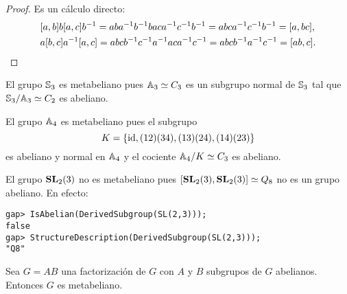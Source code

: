\begin{proof}
Es un cálculo directo:
 	\begin{align*}
 	&[a,b]b[a,c]b^{-1}=aba^{-1}b^{-1}baca^{-1}c^{-1}b^{-1}=abca^{-1}c^{-1}b^{-1}=[a,bc],\\
 	&a[b,c]a^{-1}[a,c]=abcb^{-1}c^{-1}a^{-1}aca^{-1}c^{-1}=abcb^{-1}a^{-1}c^{-1}=[ab,c].\qedhere
 	\end{align*}
\end{proof}

\begin{example}
	El grupo $\mathbb{S}_3$ es metabeliano pues $\mathbb{A}_3\simeq C_3$ es un subgrupo normal de
	$\mathbb{S}_3$ tal que $\mathbb{S}_3/\mathbb{A}_3\simeq C_2$ es abeliano.
\end{example}

\begin{example}
	El grupo $\mathbb{A}_4$ es metabeliano pues el subgrupo 
	\[
	K=\{\operatorname{id},(12)(34),(13)(24),(14)(23)\}
	\]
	es abeliano y
	normal en $\mathbb{A}_4$ y el cociente $\mathbb{A}_4/K\simeq C_3$ es abeliano.
\end{example}


\begin{example}
	El grupo $\mathbf{SL}_2(3)$ no es metabeliano pues $[\mathbf{SL}_2(3),\mathbf{SL}_2(3)]\simeq Q_8$ 
	no es un grupo abeliano. En efecto:
\begin{lstlisting}
gap> IsAbelian(DerivedSubgroup(SL(2,3)));
false
gap> StructureDescription(DerivedSubgroup(SL(2,3)));
"Q8"
\end{lstlisting}
\end{example}

\begin{theorem}[It\^o]
	\label{theorem:Ito}
	Sea $G=AB$ una factorización de $G$ con $A$ y $B$ subgrupos de $G$
	abelianos. Entonces $G$ es metabeliano.
\end{theorem}


